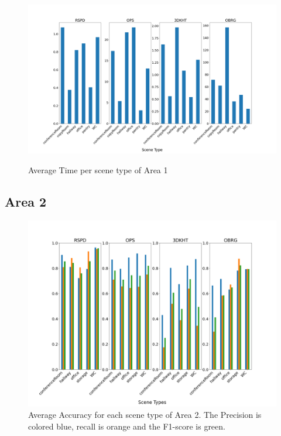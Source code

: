\documentclass[main.tex]{subfiles}
\begin{document}
\begin{figure}[H]
    \centering
    \includegraphics[width=15 cm]{images/area_1_time.png}
    \label{fig:area1T}
    \caption[Times Area 1]{Average Time per scene type of Area 1}
\end{figure}


\subsection{Area 2}

\begin{figure}[H]
    \centering
    \includegraphics[width=15 cm]{images/area_2_acc.png}
    \caption[Accuracies Area 3]{Average Accuracy for each scene type of Area 2. The Precision
        is colored blue, recall is orange and the F1-score is green. }
    \label{fig:area2A}
\end{figure}
\end{document}
